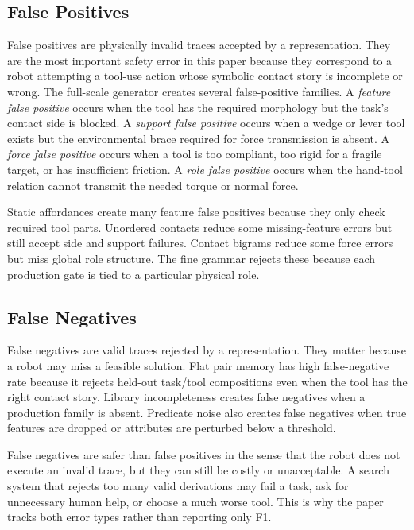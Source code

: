 \documentclass{article}
\begin{document}
\subsection{False Positives}

False positives are physically invalid traces accepted by a representation. They are the most important safety error in this paper because they correspond to a robot attempting a tool-use action whose symbolic contact story is incomplete or wrong. The full-scale generator creates several false-positive families. A \emph{feature false positive} occurs when the tool has the required morphology but the task's contact side is blocked. A \emph{support false positive} occurs when a wedge or lever tool exists but the environmental brace required for force transmission is absent. A \emph{force false positive} occurs when a tool is too compliant, too rigid for a fragile target, or has insufficient friction. A \emph{role false positive} occurs when the hand-tool relation cannot transmit the needed torque or normal force.

Static affordances create many feature false positives because they only check required tool parts. Unordered contacts reduce some missing-feature errors but still accept side and support failures. Contact bigrams reduce some force errors but miss global role structure. The fine grammar rejects these because each production gate is tied to a particular physical role.

\subsection{False Negatives}

False negatives are valid traces rejected by a representation. They matter because a robot may miss a feasible solution. Flat pair memory has high false-negative rate because it rejects held-out task/tool compositions even when the tool has the right contact story. Library incompleteness creates false negatives when a production family is absent. Predicate noise also creates false negatives when true features are dropped or attributes are perturbed below a threshold.

False negatives are safer than false positives in the sense that the robot does not execute an invalid trace, but they can still be costly or unacceptable. A search system that rejects too many valid derivations may fail a task, ask for unnecessary human help, or choose a much worse tool. This is why the paper tracks both error types rather than reporting only F1.
\end{document}
